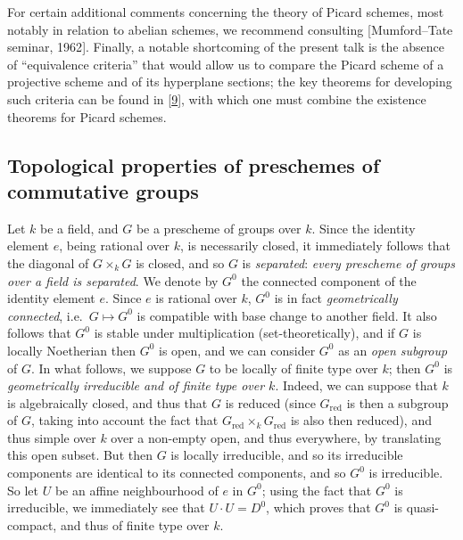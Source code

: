 \documentclass{article}
\theoremstyle{definition}
\theoremstyle{definition}
\theoremstyle{definition}
\theoremstyle{definition}
\theoremstyle{remark}
\begin{document}
For certain additional comments concerning the theory of Picard schemes, most notably in relation to abelian schemes, we recommend consulting {[}Mumford--Tate seminar, 1962{]}.
Finally, a notable shortcoming of the present talk is the absence of ``equivalence criteria'' that would allow us to compare the Picard scheme of a projective scheme and of its hyperplane sections;
the key theorems for developing such criteria can be found in {[}\protect\hyperlink{ref-Gro1960b}{9}{]}, with which one must combine the existence theorems for Picard schemes.

\hypertarget{fga-3-vi-section-1}{%
\subsection{Topological properties of preschemes of commutative groups}\label{fga-3-vi-section-1}}

Let \(k\) be a field, and \(G\) be a prescheme of groups over \(k\).
Since the identity element \(e\), being rational over \(k\), is necessarily closed, it immediately follows that the diagonal of \(G\times_k G\) is closed, and so \(G\) is \emph{separated}: \emph{every prescheme of groups over a field is separated}.
We denote by \(G^0\) the connected component of the identity element \(e\).
Since \(e\) is rational over \(k\), \(G^0\) is in fact \emph{geometrically connected}, i.e.~\(G\mapsto G^0\) is compatible with base change to another field.
It also follows that \(G^0\) is stable under multiplication (set-theoretically), and if \(G\) is locally Noetherian then \(G^0\) is open, and we can consider \(G^0\) as an \emph{open subgroup} of \(G\).
In what follows, we suppose \(G\) to be locally of finite type over \(k\);
then \(G^0\) is \emph{geometrically irreducible and of finite type over \(k\)}.
Indeed, we can suppose that \(k\) is algebraically closed, and thus that \(G\) is reduced (since \(G_\mathrm{red}\) is then a subgroup of \(G\), taking into account the fact that \(G_\mathrm{red}\times_k G_\mathrm{red}\) is also then reduced), and thus simple over \(k\) over a non-empty open, and thus everywhere, by translating this open subset.
But then \(G\) is locally irreducible, and so its irreducible components are identical to its connected components, and so \(G^0\) is irreducible.
So let \(U\) be an affine neighbourhood of \(e\) in \(G^0\);
using the fact that \(G^0\) is irreducible, we immediately see that \(U\cdot U=D^0\), which proves that \(G^0\) is quasi-compact, and thus of finite type over \(k\).
\end{document}
